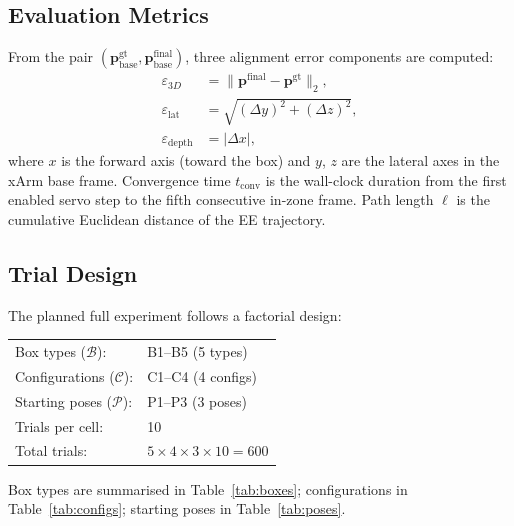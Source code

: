 \documentclass[lettersize,journal]{IEEEtran}
\begin{document}
\subsection{Evaluation Metrics}
\label{sec:metrics}

From the pair $(\mathbf{p}^{\text{gt}}_{\text{base}},
\mathbf{p}^{\text{final}}_{\text{base}})$, three alignment error components
are computed:
\begin{align}
  \varepsilon_{3D} &= \lVert \mathbf{p}^{\text{final}} -
                             \mathbf{p}^{\text{gt}} \rVert_2, \\
  \varepsilon_{\text{lat}} &= \sqrt{(\Delta y)^2 + (\Delta z)^2}, \\
  \varepsilon_{\text{depth}} &= |\Delta x|,
\end{align}
where $x$ is the forward axis (toward the box) and $y$, $z$ are the
lateral axes in the xArm base frame. Convergence time $t_{\text{conv}}$ is
the wall-clock duration from the first enabled servo step to the fifth
consecutive in-zone frame. Path length $\ell$ is the cumulative Euclidean
distance of the EE trajectory.

\subsection{Trial Design}
\label{sec:trial_design}

The planned full experiment follows a factorial design:
\begin{center}
\begin{tabular}{ll}
  Box types ($\mathcal{B}$):    & B1--B5 \quad (5 types)  \\
  Configurations ($\mathcal{C}$): & C1--C4 \quad (4 configs) \\
  Starting poses ($\mathcal{P}$): & P1--P3 \quad (3 poses)  \\
  Trials per cell:              & 10                        \\
  \midrule
  Total trials:                 & $5\times4\times3\times10 = 600$
\end{tabular}
\end{center}

Box types are summarised in Table~\ref{tab:boxes};
configurations in Table~\ref{tab:configs};
starting poses in Table~\ref{tab:poses}.
\end{document}
